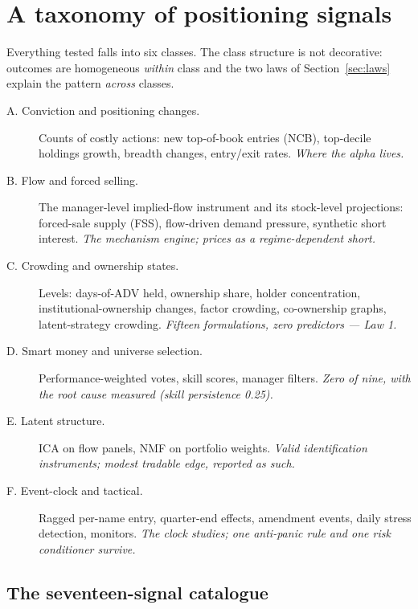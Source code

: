 \section{A taxonomy of positioning signals}
\label{sec:taxonomy}

Everything tested falls into six classes. The class structure is not
decorative: outcomes are homogeneous \emph{within} class and the two
laws of Section~\ref{sec:laws} explain the pattern \emph{across}
classes.

\begin{description}
\item[A. Conviction and positioning changes.] Counts of costly
  actions: new top-of-book entries (NCB), top-decile holdings growth,
  breadth changes, entry/exit rates. \emph{Where the alpha lives.}
\item[B. Flow and forced selling.] The manager-level implied-flow
  instrument and its stock-level projections: forced-sale supply
  (FSS), flow-driven demand pressure, synthetic short interest.
  \emph{The mechanism engine; prices as a regime-dependent short.}
\item[C. Crowding and ownership states.] Levels: days-of-ADV held,
  ownership share, holder concentration, institutional-ownership
  changes, factor crowding, co-ownership graphs, latent-strategy
  crowding. \emph{Fifteen formulations, zero predictors --- Law 1.}
\item[D. Smart money and universe selection.] Performance-weighted
  votes, skill scores, manager filters. \emph{Zero of nine, with the
  root cause measured (skill persistence 0.25).}
\item[E. Latent structure.] ICA on flow panels, NMF on portfolio
  weights. \emph{Valid identification instruments; modest tradable
  edge, reported as such.}
\item[F. Event-clock and tactical.] Ragged per-name entry, quarter-end
  effects, amendment events, daily stress detection, monitors.
  \emph{The clock studies; one anti-panic rule and one risk
  conditioner survive.}
\end{description}

\subsection{The seventeen-signal catalogue}
\label{sec:catalogue}

